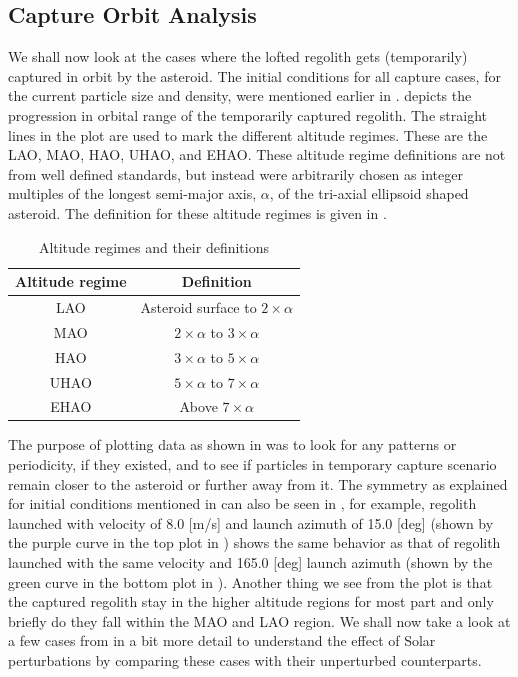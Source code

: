 \subsection{Capture Orbit Analysis}
\label{subsec:capture_orbit_analysis_as_is}
We shall now look at the cases where the lofted regolith gets (temporarily) captured in orbit by the asteroid. The initial conditions for all capture cases, for the current particle size and density, were mentioned earlier in .  depicts the progression in orbital range of the temporarily captured regolith. The straight lines in the plot are used to mark the different altitude regimes. These are the \gls{LAO}, \gls{MAO}, \gls{HAO}, \gls{UHAO}, and \gls{EHAO}. These altitude regime definitions are not from well defined standards, but instead were arbitrarily chosen as integer multiples of the longest semi-major axis, $\alpha$, of the tri-axial ellipsoid shaped asteroid. The definition for these altitude regimes is given in .
\begin{table}[htb]
\centering
\captionsetup{justification=centering}
\caption{Altitude regimes and their definitions}
\label{tab:altitude_regimes}
\begin{tabular}{|c|c|}
\hline
\textbf{Altitude regime}        & \textbf{Definition}                    \\ \hline
\gls{LAO}                       & Asteroid surface to $2 \times \alpha$  \\ \hline
\gls{MAO}                       & $2 \times \alpha$ to $3 \times \alpha$ \\ \hline
\gls{HAO}                       & $3 \times \alpha$ to $5 \times \alpha$ \\ \hline
\gls{UHAO}                      & $5 \times \alpha$ to $7 \times \alpha$ \\ \hline
\gls{EHAO}                      & Above $7 \times \alpha$                \\ \hline
\end{tabular}
\end{table}
\FloatBarrier
The purpose of plotting data as shown in  was to look for any patterns or periodicity, if they existed, and to see if particles in temporary capture scenario remain closer to the asteroid or further away from it. The symmetry as explained for initial conditions mentioned in  can also be seen in , for example, regolith launched with velocity of 8.0 [m/s] and launch azimuth of 15.0 [deg] (shown by the purple curve in the top plot in ) shows the same behavior as that of regolith launched with the same velocity and 165.0 [deg] launch azimuth (shown by the green curve in the bottom plot in ). Another thing we see from the plot is that the captured regolith stay in the higher altitude regions for most part and only briefly do they fall within the \gls{MAO} and \gls{LAO} region. We shall now take a look at a few cases from  in a bit more detail to understand the effect of Solar perturbations by comparing these cases with their unperturbed counterparts.
